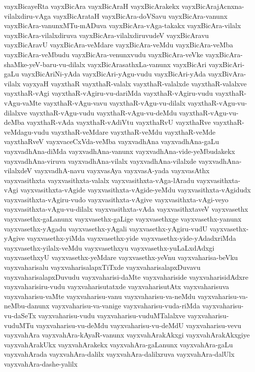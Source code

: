 {vayxBicayeRta
vayxBicAra
vayxBicAraH
vayxBicArakekx
vayxBicArajAcnxna-vilalxdiru-vAga
vayxBicArataH
vayxBicAra-doVSavu
vayxBicAra-vanunx
vayxBicAra-vanunxMTu-mADuva
vayxBicAra-vAga-takakx
vayxBicAra-vilalx
vayxBicAra-vilalxdiruva
vayxBicAra-vilalxdiruvudeV
vayxBicAravu
vayxBicAravU
vayxBicAra-veMdare
vayxBicAra-veMdu
vayxBicAra-veMba
vayxBicAra-veMbudu
vayxBicAra-venunxvudu
vayxBicAra-veVke
vayxBicAra-shaMke-yeV-baru-vu-dilalx
vayxBicArasathxLa-vanunx
vayxBicAri
vayxBicAri-gaLu
vayxBicAriNi-yAda
vayxBicAri-yAgu-vudu
vayxBicAri-yAda
vayxBivAra-vilalx
vayxyaH
vayxthaR
vayxthaR-valalx
vayxthaR-valalxde
vayxthaR-valalxve
vayxthaR-vAgi
vayxthaR-vAgiru-vu-dariMda
vayxthaR-vAgiru-vudu
vayxthaR-vAgu-vaMte
vayxthaR-vAgu-vavu
vayxthaR-vAgu-vu-dilalx
vayxthaR-vAgu-vu-dilalxve
vayxthaR-vAgu-vudu
vayxthaR-vAgu-vu-deMdu
vayxthaR-vAgu-vu-deMba
vayxthaR-vAda
vayxthaR-vAdiVtu
vayxthaRvU
vayxthaRve
vayxthaR-veMdagu-vudu
vayxthaR-veMdare
vayxthaR-veMdu
vayxthaR-veMde
vayxthaRveV
vayxvaceCxVda-veMba
vayxvadhAna
vayxvadhAna-gaLu
vayxvadhAna-diMda
vayxvadhAna-vanunx
vayxvadhAna-vide-yeMbudakekx
vayxvadhAna-viruva
vayxvadhAna-vilalx
vayxvadhAna-vilalxde
vayxvadhAna-vilalxdeV
vayxvadhA-navu
vayxvasAya
vayxvasA-yada
vayxvasAthx
vayxvasithxta
vayxvasithxta-valalx
vayxvasithxta-vAga-lAradu
vayxvasithxta-vAgi
vayxvasithxta-vAgide
vayxvasithxta-vAgide-yeMdu
vayxvasithxta-vAgidudx
vayxvasithxta-vAgiru-vudo
vayxvasithxta-vAgive
vayxvasithxta-vAgi-veyo
vayxvasithxta-vAgu-vu-dilalx
vayxvasithxta-vAda
vayxvasithxtaveV
vayxvasethx
vayxvasethx-gaLanunx
vayxvasethx-gaLige
vayxvasethxge
vayxvasethx-yanunx
vayxvasethx-yAgadu
vayxvasethx-yAgali
vayxvasethx-yAgiru-vudU
vayxvasethx-yAgive
vayxvasethx-yiMda
vayxvasethx-yide
vayxvasethx-yide-yAdadxriMda
vayxvasethx-yilalx-veMdu
vayxvasethxyu
vayxvasethx-yuLaLxdAdxgi
vayxvasethxyU
vayxvasethx-yeMdare
vayxvasethx-yeVnu
vayxvaharisa-beVku
vayxvaharisalu
vayxvaharisalapxTiTxde
vayxvaharisalapxDuvavu
vayxvaharisalapxDuvudu
vayxvaharisi-daMte
vayxvahariside
vayxvaharisidAdxre
vayxvaharisiru-vudu
vayxvaharisutatxde
vayxvaharisutAtx
vayxvaharisuva
vayxvaharisu-vaMte
vayxvaharisu-vanu
vayxvaharisu-va-neMdu
vayxvaharisu-va-neMbu-danunx
vayxvaharisu-va-vanige
vayxvaharisu-vuda-riMda
vayxvaharisu-vu-daSeTx
vayxvaharisu-vudu
vayxvaharisu-vuduMTalalxve
vayxvaharisu-vuduMTu
vayxvaharisu-vu-deMdu
vayxvaharisu-vu-deMdU
vayxvaharisu-vevu
vayxvahAra
vayxvahAra-kAyaR-vanunx
vayxvahArakAkxgi
vayxvahArakAkxgiye
vayxvahArakUkx
vayxvahArakekx
vayxvahAra-gaLanunx
vayxvahAra-gaLu
vayxvahArada
vayxvahAra-dalilx
vayxvahAra-dalilxruva
vayxvahAra-dalUlx
vayxvahAra-dashe-yalilx
}
